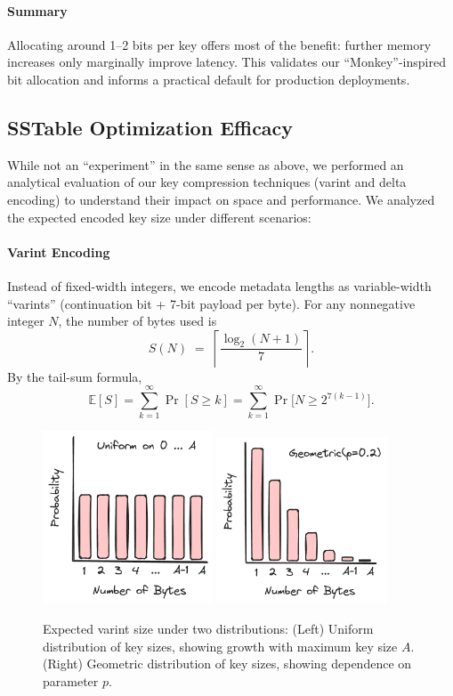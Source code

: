 \documentclass[10pt]{article}
\begin{document}
\paragraph{Summary}
Allocating around 1–2 bits per key offers most of the benefit: further memory increases only marginally improve latency. This validates our “Monkey”-inspired bit allocation and informs a practical default for production deployments.


\subsection{SSTable Optimization Efficacy}
While not an “experiment” in the same sense as above, we performed an analytical evaluation of our key compression techniques (varint and delta encoding) to understand their impact on space and performance. We analyzed the expected encoded key size under different scenarios:
\paragraph{Varint Encoding}
Instead of fixed-width integers, we encode metadata lengths as variable-width “varints” (continuation bit + 7-bit payload per byte).  For any nonnegative integer \(N\), the number of bytes used is
\[
S(N) \;=\;\left\lceil \frac{\log_{2}(N+1)}{7} \right\rceil.
\]
By the tail-sum formula,
\[
\mathbb{E}[S] = \sum_{k=1}^{\infty} \Pr[S \ge k]
           = \sum_{k=1}^{\infty} \Pr\bigl[N \ge 2^{7(k-1)}\bigr].
\]

\begin{figure}[htbp]
    \centering
    \includegraphics[width=0.45\textwidth]{uniform.png}
    \includegraphics[width=0.45\textwidth]{geometric.png}
    \caption{Expected varint size under two distributions: (Left) Uniform distribution of key sizes, showing growth with maximum key size \(A\). (Right) Geometric distribution of key sizes, showing dependence on parameter \(p\).}
    \label{fig:varint_combined}
\end{figure}
\end{document}
